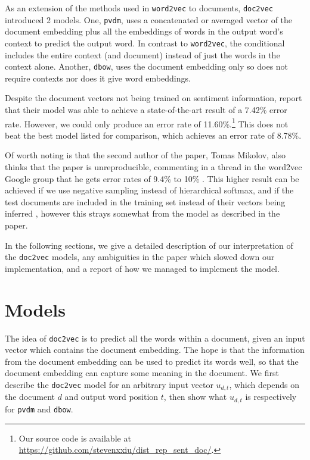 \documentclass{article}
\begin{document}
As an extension of the methods used in \texttt{word2vec} to documents, \texttt{doc2vec} \citep{le_distributed_2014} introduced 2 models. One, \texttt{pvdm}, uses a concatenated or averaged vector of the document embedding plus all the embeddings of words in the output word's context to predict the output word. In contrast to \texttt{word2vec}, the conditional includes the entire context (and document) instead of just the words in the context alone. Another, \texttt{dbow}, uses the document embedding only so does not require contexts nor does it give word embeddings.

Despite the document vectors not being trained on sentiment information, \cite{le_distributed_2014} report that their model was able to achieve a state-of-the-art result of a 7.42\% error rate. However, we could only produce an error rate of 11.60\%.\footnote{Our source code is available at \url{https://github.com/stevenxxiu/dist_rep_sent_doc/}.} This does not beat the best model listed for comparison, which achieves an error rate of 8.78\%.

Of worth noting is that the second author of the paper, Tomas Mikolov, also thinks that the paper is unreproducible, commenting in a thread in the word2vec Google group that he gets error rates of 9.4\% to 10\% \citep{mikolov_distributed_2014} . This higher result can be achieved if we use negative sampling instead of hierarchical softmax, and if the test documents are included in the training set instead of their vectors being inferred \citep{mohr_gensim_2017}, however this strays somewhat from the model as described in the paper.

In the following sections, we give a detailed description of our interpretation of the \texttt{doc2vec} models, any ambiguities in the paper which slowed down our implementation, and a report of how we managed to implement the model.

\section{Models}
The idea of \texttt{doc2vec} is to predict all the words within a document, given an input vector which contains the document embedding. The hope is that the information from the document embedding can be used to predict its words well, so that the document embedding can capture some meaning in the document. We first describe the \texttt{doc2vec} model for an arbitrary input vector $u_{d,t}$, which depends on the document $d$ and output word position $t$, then show what $u_{d,t}$ is respectively for \texttt{pvdm} and \texttt{dbow}.
\end{document}
